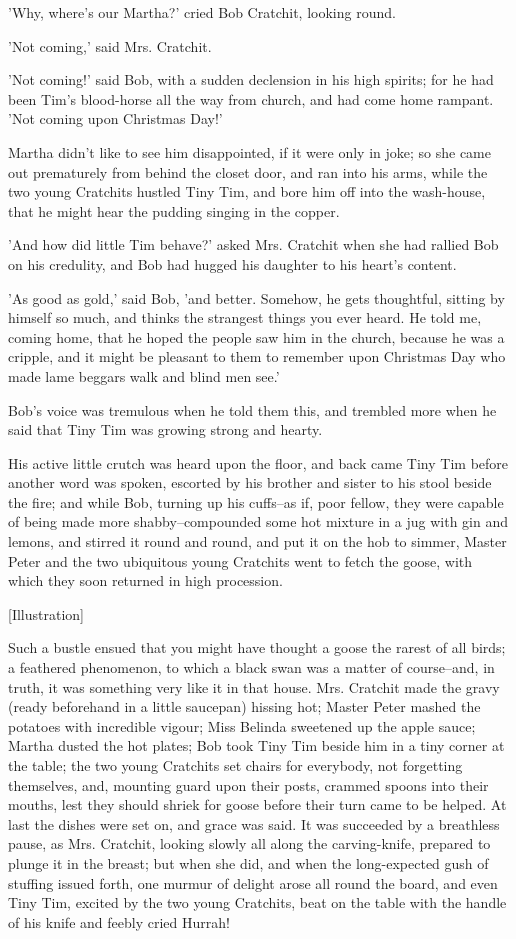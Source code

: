 'Why, where's our Martha?' cried Bob Cratchit, looking round.

'Not coming,' said Mrs. Cratchit.

'Not coming!' said Bob, with a sudden declension in his high spirits;
for he had been Tim's blood-horse all the way from church, and had come
home rampant. 'Not coming upon Christmas Day!'

Martha didn't like to see him disappointed, if it were only in joke; so
she came out prematurely from behind the closet door, and ran into his
arms, while the two young Cratchits hustled Tiny Tim, and bore him off
into the wash-house, that he might hear the pudding singing in the
copper.

'And how did little Tim behave?' asked Mrs. Cratchit when she had
rallied Bob on his credulity, and Bob had hugged his daughter to his
heart's content.

'As good as gold,' said Bob, 'and better. Somehow, he gets thoughtful,
sitting by himself so much, and thinks the strangest things you ever
heard. He told me, coming home, that he hoped the people saw him in the
church, because he was a cripple, and it might be pleasant to them to
remember upon Christmas Day who made lame beggars walk and blind men
see.'

Bob's voice was tremulous when he told them this, and trembled more when
he said that Tiny Tim was growing strong and hearty.

His active little crutch was heard upon the floor, and back came Tiny
Tim before another word was spoken, escorted by his brother and
sister to his stool beside the fire; and while Bob, turning up his
cuffs--as if, poor fellow, they were capable of being made more
shabby--compounded some hot mixture in a jug with gin and lemons, and
stirred it round and round, and put it on the hob to simmer, Master
Peter and the two ubiquitous young Cratchits went to fetch the goose,
with which they soon returned in high procession.

[Illustration]

Such a bustle ensued that you might have thought a goose the rarest of
all birds; a feathered phenomenon, to which a black swan was a matter of
course--and, in truth, it was something very like it in that house. Mrs.
Cratchit made the gravy (ready beforehand in a little saucepan) hissing
hot; Master Peter mashed the potatoes with incredible vigour; Miss
Belinda sweetened up the apple sauce; Martha dusted the hot plates; Bob
took Tiny Tim beside him in a tiny corner at the table; the two young
Cratchits set chairs for everybody, not forgetting themselves, and,
mounting guard upon their posts, crammed spoons into their mouths, lest
they should shriek for goose before their turn came to be helped. At
last the dishes were set on, and grace was said. It was succeeded by a
breathless pause, as Mrs. Cratchit, looking slowly all along the
carving-knife, prepared to plunge it in the breast; but when she did,
and when the long-expected gush of stuffing issued forth, one murmur of
delight arose all round the board, and even Tiny Tim, excited by the two
young Cratchits, beat on the table with the handle of his knife and
feebly cried Hurrah!

